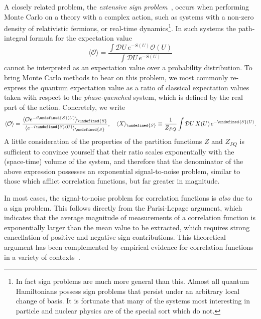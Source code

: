 \documentclass[12pt]{article}
\let\Re\undefined
\let\Im\undefined
\DeclareMathOperator{\Re}{Re}
\DeclareMathOperator{\Im}{Im}
\begin{document}
A closely related problem, the \emph{extensive sign problem}~\cite{Gibbs:1986ut,Splittorff:2006fu,Splittorff:2007ck,Aarts:2008wh,deForcrand:2010ys,Alexandru:2014hga}, occurs when performing Monte Carlo
on a theory with a complex action, such as systems with a non-zero density of relativistic fermions, or real-time dynamics\footnote{In fact sign problems are much more general than this. Almost all quantum Hamiltonians possess sign problems that persist under an arbitrary local change of basis. It is fortunate that many of the systems most interesting in particle and nuclear physics are of the special sort which do not.}. In such systems
the path-integral formula for the expectation value
\begin{equation}
\langle \mathcal O \rangle =
\frac{\int \mathcal D U\, e^{-S(U)} \mathcal O(U)}{\int \mathcal D U\, e^{-S(U)}}
\end{equation}
cannot be interpreted as an expectation value over a probability distribution. To bring Monte Carlo methods to bear on this problem, we most commonly re-express the quantum expectation value as a ratio of classical expectation values taken with respect to the \emph{phase-quenched} system, which is defined by the real part of the action. Concretely, we write
\begin{equation}
    \langle \mathcal{O} \rangle = \frac{\langle \mathcal{O} e^{-i \Im{S}(U)} \rangle_{\Re{S}}}{\langle e^{-i \Im{S}(U)} \rangle_{\Re{S}}},
    \quad 
    \langle X \rangle_{\Re{S}} \equiv \frac{1}{Z_{PQ}} \int \mathcal{D}U \, X(U) \, e^{-\Re{S}(U)}
    \text.
\end{equation}
A little consideration of the properties of the partition functions $Z$ and $Z_{PQ}$ is sufficient to convince yourself that their ratio scales exponentially with the (space-time) volume of the system, and therefore that the denominator of the above expression possesses an exponential signal-to-noise problem, similar to those which afflict correlation functions, but far greater in magnitude.

In most cases, the signal-to-noise problem for correlation functions is \emph{also} due to a sign problem. This follows directly from the Parisi-Lepage argument, which indicates that the average magnitude of measurements of a correlation function is exponentially larger than the mean value to be extracted, which requires strong cancellation of positive and negative sign contributions. This theoretical argument has been complemented by empirical evidence for correlation functions in a variety of contexts~\cite{Beane:2009kya,Beane:2014oea,Wagman:2016bam,Wagman:2017gqi,Davoudi:2020ngi}.
\end{document}
